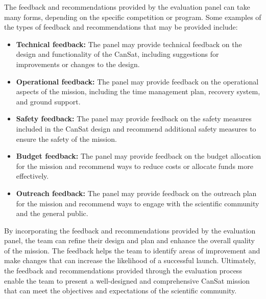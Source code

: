 \documentclass[11pt]{article}
\begin{document}
The feedback and recommendations provided by the evaluation panel can take many forms, depending on the specific competition or program. Some examples of the types of feedback and recommendations that may be provided include:

\begin{itemize}
    \item {\textbf{Technical feedback:}} The panel may provide technical feedback on the design and functionality of the CanSat, including suggestions for improvements or changes to the design.

    \item {\textbf{Operational feedback:}} The panel may provide feedback on the operational aspects of the mission, including the time management plan, recovery system, and ground support.

    \item {\textbf{Safety feedback:}} The panel may provide feedback on the safety measures included in the CanSat design and recommend additional safety measures to ensure the safety of the mission.

    \item {\textbf{Budget feedback:}} The panel may provide feedback on the budget allocation for the mission and recommend ways to reduce costs or allocate funds more effectively.

    \item {\textbf{Outreach feedback:}} The panel may provide feedback on the outreach plan for the mission and recommend ways to engage with the scientific community and the general public.
\end{itemize}

By incorporating the feedback and recommendations provided by the evaluation panel, the team can refine their design and plan and enhance the overall quality of the mission. The feedback helps the team to identify areas of improvement and make changes that can increase the likelihood of a successful launch. Ultimately, the feedback and recommendations provided through the evaluation process enable the team to present a well-designed and comprehensive CanSat mission that can meet the objectives and expectations of the scientific community.
\end{document}
